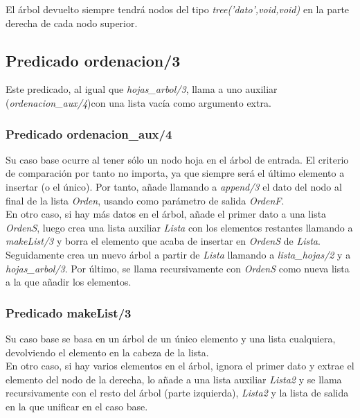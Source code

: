 \documentclass[12pt, a4paper, spanish]{article}
\begin{document}
El árbol devuelto siempre tendrá nodos del tipo \textit{tree('dato',void,void)} en la parte derecha de cada nodo superior.

\subsection{Predicado ordenacion/3}


Este predicado, al igual que \textit{hojas\_arbol/3}, llama a uno auxiliar (\textit{ordenacion\_aux/4})con una lista vacía como argumento extra.

\subsubsection{Predicado ordenacion\_aux/4}


Su caso base ocurre al tener sólo un nodo hoja en el árbol de entrada. El criterio de comparación por tanto no importa, ya que siempre será el último elemento a insertar (o el único). Por tanto, añade llamando a \textit{append/3} el dato del nodo al final de la lista \textit{Orden}, usando como parámetro de salida \textit{OrdenF}.\\

En otro caso, si hay más datos en el árbol, añade el primer  dato a una lista \textit{OrdenS}, luego crea una lista auxiliar \textit{Lista} con los elementos restantes llamando a \textit{makeList/3} y borra el elemento que acaba de insertar en \textit{OrdenS} de \textit{Lista}. Seguidamente crea un nuevo árbol a partir de \textit{Lista} llamando a \textit{lista\_hojas/2} y a \textit{hojas\_arbol/3}. Por último, se llama recursivamente con \textit{OrdenS} como nueva lista a la que añadir los elementos.

\subsubsection{Predicado makeList/3}


Su caso base se basa en un árbol de un único elemento y una lista cualquiera, devolviendo el elemento en la cabeza de la lista.\\

En otro caso, si hay varios elementos en el árbol, ignora el primer dato y extrae el elemento del nodo de la derecha, lo añade a una lista auxiliar \textit{Lista2} y se llama recursivamente con el resto del árbol (parte izquierda), \textit{Lista2} y la lista de salida en la que unificar en el caso base.
\end{document}
